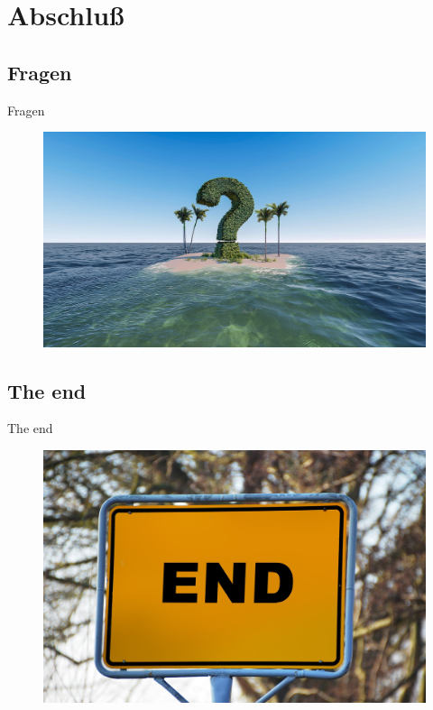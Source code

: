\section{Abschluß}

\subsection{Fragen}

\begin{frame}{Fragen}
  \begin{figure}[!ht]
     \centering
     \includegraphics[width=0.9\linewidth]{img/question-mark-3255140_1920.jpg}
  \end{figure}
\end{frame}

\subsection{The end}

\begin{frame}{The end}
  \begin{figure}[!ht]
     \centering
     \includegraphics[width=0.8\linewidth]{img/town-sign-1158385_1920.jpg}
  \end{figure}
\end{frame}



